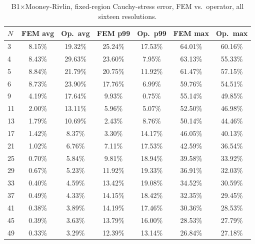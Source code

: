 \documentclass[final,5p,times]{elsarticle}
\begin{document}
\begin{table}[ht]
\centering
\caption{B1$\times$Mooney-Rivlin, fixed-region Cauchy-stress error, FEM
  vs.\ operator, all sixteen resolutions.}
\label{tab:b1-b1mr-b}
\scriptsize
\begin{tabular}{lcccccc}
\toprule
$N$ & FEM avg & Op.\ avg & FEM p99 & Op.\ p99 & FEM max & Op.\ max \\
\midrule
3  & 8.15\% & 19.32\% & 25.24\% & 17.53\% & 64.01\% & 60.16\% \\
4  & 8.43\% & 29.63\% & 23.60\% & 7.95\%  & 63.13\% & 55.33\% \\
5  & 8.84\% & 21.79\% & 20.75\% & 11.92\% & 61.47\% & 57.15\% \\
6  & 8.73\% & 23.90\% & 17.76\% & 6.99\%  & 59.76\% & 54.51\% \\
9  & 4.19\% & 17.64\% & 9.93\%  & 0.75\%  & 55.14\% & 49.85\% \\
11 & 2.00\% & 13.11\% & 5.96\%  & 5.07\%  & 52.50\% & 46.98\% \\
13 & 1.79\% & 10.69\% & 2.43\%  & 8.76\%  & 50.14\% & 44.46\% \\
17 & 1.42\% & 8.37\%  & 3.30\%  & 14.17\% & 46.05\% & 40.13\% \\
21 & 1.02\% & 6.76\%  & 7.11\%  & 17.53\% & 42.59\% & 36.54\% \\
25 & 0.70\% & 5.84\%  & 9.81\%  & 18.94\% & 39.58\% & 33.92\% \\
29 & 0.67\% & 5.23\%  & 11.92\% & 19.33\% & 36.91\% & 32.03\% \\
33 & 0.40\% & 4.59\%  & 13.42\% & 19.08\% & 34.52\% & 30.59\% \\
37 & 0.49\% & 4.33\%  & 14.15\% & 18.42\% & 32.35\% & 29.45\% \\
41 & 0.38\% & 3.89\%  & 14.19\% & 17.46\% & 30.36\% & 28.53\% \\
45 & 0.39\% & 3.63\%  & 13.79\% & 16.00\% & 28.53\% & 27.79\% \\
49 & 0.33\% & 3.29\%  & 12.39\% & 13.14\% & 26.84\% & 27.18\% \\
\bottomrule
\end{tabular}
\end{table}
\end{document}
